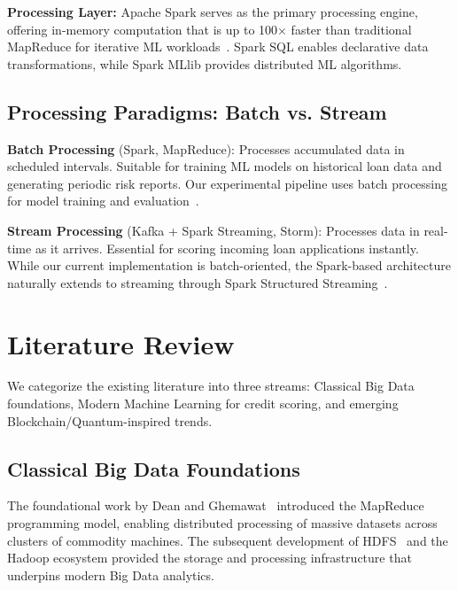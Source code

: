 \documentclass[preprint,12pt,authoryear]{elsarticle}
\begin{document}
\textbf{Processing Layer:} Apache Spark serves as the primary processing engine, offering in-memory computation that is up to 100$\times$ faster than traditional MapReduce for iterative ML workloads~\cite{zaharia2016spark}. Spark SQL enables declarative data transformations, while Spark MLlib provides distributed ML algorithms.

\subsection{Processing Paradigms: Batch vs. Stream}

\textbf{Batch Processing} (Spark, MapReduce): Processes accumulated data in scheduled intervals. Suitable for training ML models on historical loan data and generating periodic risk reports. Our experimental pipeline uses batch processing for model training and evaluation~\cite{dean2004mapreduce, sakr2017frameworks}.

\textbf{Stream Processing} (Kafka + Spark Streaming, Storm): Processes data in real-time as it arrives. Essential for scoring incoming loan applications instantly. While our current implementation is batch-oriented, the Spark-based architecture naturally extends to streaming through Spark Structured Streaming~\cite{kreps2011kafka}.



\section{Literature Review}
\label{sec:literature}

We categorize the existing literature into three streams: Classical Big Data foundations, Modern Machine Learning for credit scoring, and emerging Blockchain/Quantum-inspired trends.

\subsection{Classical Big Data Foundations}

The foundational work by Dean and Ghemawat~\cite{dean2004mapreduce} introduced the MapReduce programming model, enabling distributed processing of massive datasets across clusters of commodity machines. The subsequent development of HDFS~\cite{shvachko2010hdfs} and the Hadoop ecosystem provided the storage and processing infrastructure that underpins modern Big Data analytics.
\end{document}
